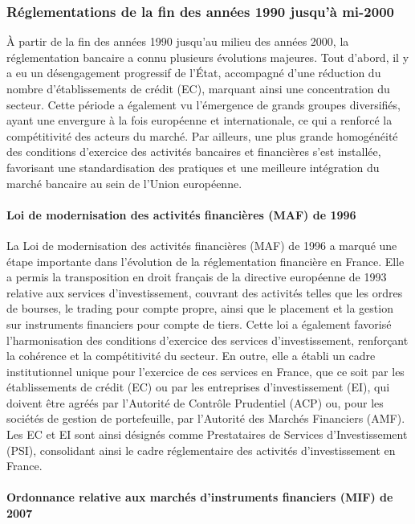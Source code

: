 \documentclass[a4paper, 12pt]{report}
\begin{document}
\subsubsection{Réglementations de la fin des années 1990 jusqu’à mi-2000}

À partir de la fin des années 1990 jusqu’au milieu des années 2000, la réglementation bancaire a connu plusieurs évolutions majeures. Tout d'abord, il y a eu un désengagement progressif de l’État, accompagné d’une réduction du nombre d’établissements de crédit (EC), marquant ainsi une concentration du secteur. Cette période a également vu l’émergence de grands groupes diversifiés, ayant une envergure à la fois européenne et internationale, ce qui a renforcé la compétitivité des acteurs du marché. Par ailleurs, une plus grande homogénéité des conditions d’exercice des activités bancaires et financières s’est installée, favorisant une standardisation des pratiques et une meilleure intégration du marché bancaire au sein de l’Union européenne.

\paragraph{Loi de modernisation des activités financières (MAF) de 1996}

La Loi de modernisation des activités financières (MAF) de 1996 a marqué une étape importante dans l'évolution de la réglementation financière en France. Elle a permis la transposition en droit français de la directive européenne de 1993 relative aux services d'investissement, couvrant des activités telles que les ordres de bourses, le trading pour compte propre, ainsi que le placement et la gestion sur instruments financiers pour compte de tiers. Cette loi a également favorisé l’harmonisation des conditions d’exercice des services d'investissement, renforçant la cohérence et la compétitivité du secteur. En outre, elle a établi un cadre institutionnel unique pour l’exercice de ces services en France, que ce soit par les établissements de crédit (EC) ou par les entreprises d’investissement (EI), qui doivent être agréés par l’Autorité de Contrôle Prudentiel (ACP) ou, pour les sociétés de gestion de portefeuille, par l’Autorité des Marchés Financiers (AMF). Les EC et EI sont ainsi désignés comme Prestataires de Services d’Investissement (PSI), consolidant ainsi le cadre réglementaire des activités d’investissement en France.

\paragraph{Ordonnance relative aux marchés d’instruments financiers (MIF) de 2007}
\end{document}
